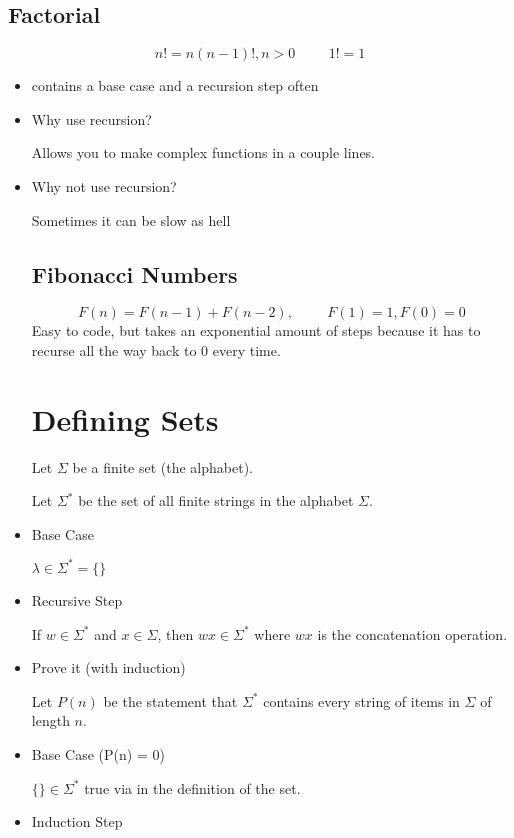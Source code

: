 \documentclass{report}
\begin{document}
\subsection{Factorial}
\[
n! = n(n-1)!, n > 0 \hspace{1cm} 1! = 1
\]
\begin{itemize}
\item
contains a base case and a recursion step often

\item
Why use recursion?

Allows you to make complex functions in a couple lines.

\item
Why not use recursion?

Sometimes it can be slow as hell

\subsection{Fibonacci Numbers}
\[
F(n) = F(n-1) + F(n-2), \hspace{1cm} F(1) = 1, F(0) = 0
\]
Easy to code, but takes an exponential amount of steps because it has to recurse all the way back to 0 every time.

\section{Defining Sets}
Let $\Sigma$ be a finite set (the alphabet).

Let $\Sigma ^*$ be the set of all finite strings in the alphabet $\Sigma$.

\item
Base Case

$
\lambda \in \Sigma^* = \{\}
$ 

\item
Recursive Step

If $w \in \Sigma^*$ and $x \in \Sigma$, then $wx \in \Sigma^*$ where $wx$ is the concatenation operation.

\item
Prove it (with induction)

Let $P(n)$ be the statement that $\Sigma^*$ contains every string of items in $\Sigma$ of length $n$.
\item
Base Case (P(n) = 0)

$\{\} \in \Sigma^*$ true via in the definition of the set.

\item
Induction Step


\end{itemize}
\end{document}
